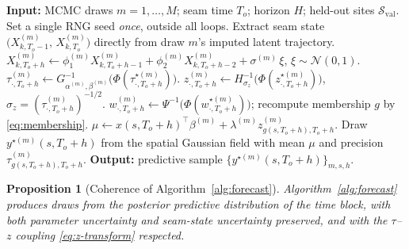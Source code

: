 \documentclass[11pt]{article}
\newtheorem{proposition}{Proposition}
\theoremstyle{definition}
\theoremstyle{remark}
\newcommand{\Norm}{\mathcal{N}}
\begin{document}
\begin{algorithm}[h]
\caption{Posterior predictive forecast over a held-out time block}
\label{alg:forecast}
\begin{algorithmic}[1]
\State \textbf{Input:} MCMC draws $m=1,\dots,M$; seam time $T_o$;
        horizon $H$; held-out sites $\mathcal{S}_{\text{val}}$.
\State Set a single RNG seed \emph{once}, outside all loops.
    \State Extract seam state
           $\big(X^{(m)}_{k,T_o-1},\, X^{(m)}_{k,T_o}\big)$
           directly from draw $m$'s imputed latent trajectory.
      \State $X^{(m)}_{k,T_o+h} \gets
              \phi_1^{(m)} X^{(m)}_{k,T_o+h-1}
            + \phi_2^{(m)} X^{(m)}_{k,T_o+h-2}
            + \sigma^{(m)}\,\xi$,
            \quad $\xi\sim\Norm(0,1)$.
    \EndFor
  \EndFor
    \State $\tau^{(m)}_{\cdot,T_o+h} \gets
            G^{-1}_{\alpha^{(m)},\beta^{(m)}}
            \!\big(\Phi(\tau^{\star(m)}_{\cdot,T_o+h})\big)$.
    \State $z^{(m)}_{\cdot,T_o+h} \gets
            H^{-1}_{\sigma_z}\!\big(\Phi(z^{\star(m)}_{\cdot,T_o+h})\big)$,
            \quad $\sigma_z = (\tau^{(m)}_{\cdot,T_o+h})^{-1/2}$.
    \State $w^{(m)}_{\cdot,T_o+h} \gets
            \Psi^{-1}\!\big(\Phi(w^{\star(m)}_{\cdot,T_o+h})\big)$;
            recompute membership $g$ by \eqref{eq:membership}.
      \State $\mu \gets x(s,T_o+h)^\top\beta^{(m)}
              + \lambda^{(m)} z^{(m)}_{g(s,T_o+h),T_o+h}$.
      \State Draw $y^{\star(m)}(s,T_o+h)$ from the spatial Gaussian
              field with mean $\mu$ and precision
              $\tau^{(m)}_{g(s,T_o+h),T_o+h}$.
    \EndFor
  \EndFor
\EndFor
\State \textbf{Output:} predictive sample
        $\{y^{\star(m)}(s,T_o+h)\}_{m,s,h}$.
\end{algorithmic}
\end{algorithm}

\begin{proposition}[Coherence of Algorithm~\ref{alg:forecast}]
\label{prop:coherence}
Algorithm~\ref{alg:forecast} produces draws from the posterior
predictive distribution of the time block, with both parameter
uncertainty and seam-state uncertainty preserved, and with the
$\tau$--$z$ coupling \eqref{eq:z-transform} respected.
\end{proposition}
\end{document}
